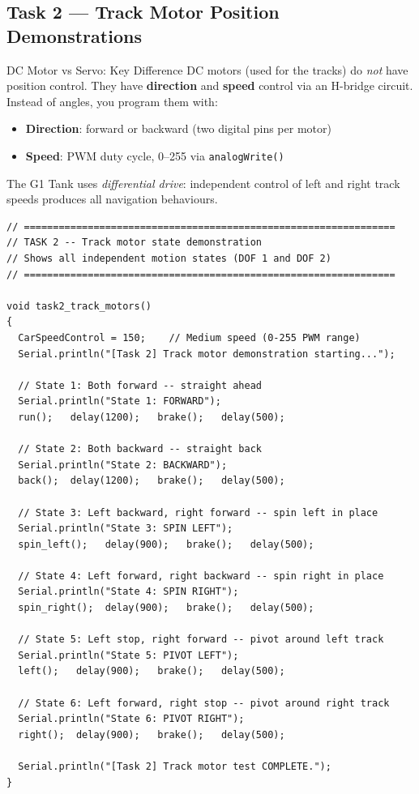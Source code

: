 \documentclass[12pt,a4paper]{article}
\begin{document}
\subsection{Task 2 --- Track Motor Position Demonstrations}

\begin{conceptbox}{DC Motor vs Servo: Key Difference}
DC motors (used for the tracks) do \emph{not} have position control.
They have \textbf{direction} and \textbf{speed} control via an H-bridge
circuit. Instead of angles, you program them with:
\begin{itemize}[leftmargin=1.5em]
  \item \textbf{Direction}: forward or backward (two digital pins per motor)
  \item \textbf{Speed}: PWM duty cycle, 0--255 via \texttt{analogWrite()}
\end{itemize}
The G1 Tank uses \emph{differential drive}: independent control of left and
right track speeds produces all navigation behaviours.
\end{conceptbox}

\begin{lstlisting}[style=arduino,caption={Task 2 --- DC motor position/state demonstration}]
// ================================================================
// TASK 2 -- Track motor state demonstration
// Shows all independent motion states (DOF 1 and DOF 2)
// ================================================================

void task2_track_motors()
{
  CarSpeedControl = 150;    // Medium speed (0-255 PWM range)
  Serial.println("[Task 2] Track motor demonstration starting...");

  // State 1: Both forward -- straight ahead
  Serial.println("State 1: FORWARD");
  run();   delay(1200);   brake();   delay(500);

  // State 2: Both backward -- straight back
  Serial.println("State 2: BACKWARD");
  back();  delay(1200);   brake();   delay(500);

  // State 3: Left backward, right forward -- spin left in place
  Serial.println("State 3: SPIN LEFT");
  spin_left();   delay(900);   brake();   delay(500);

  // State 4: Left forward, right backward -- spin right in place
  Serial.println("State 4: SPIN RIGHT");
  spin_right();  delay(900);   brake();   delay(500);

  // State 5: Left stop, right forward -- pivot around left track
  Serial.println("State 5: PIVOT LEFT");
  left();   delay(900);   brake();   delay(500);

  // State 6: Left forward, right stop -- pivot around right track
  Serial.println("State 6: PIVOT RIGHT");
  right();  delay(900);   brake();   delay(500);

  Serial.println("[Task 2] Track motor test COMPLETE.");
}
\end{lstlisting}
\end{document}

